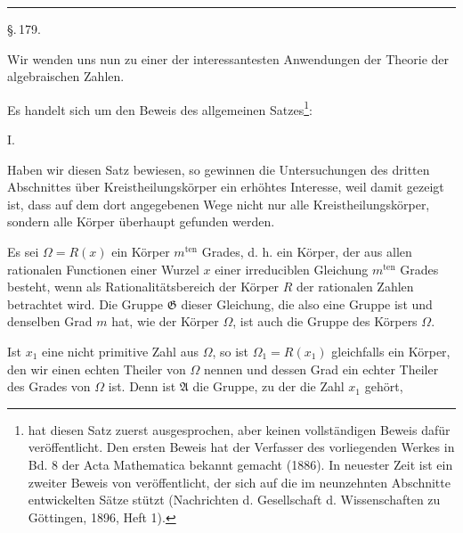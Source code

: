 
\begin{center}


\rule{3cm}{0.4pt}

\S.\,179.

\end{center}

Wir wenden uns nun zu einer der interessantesten Anwendungen der Theorie der algebraischen Zahlen.

\begingroup
\renewcommand{\thefootnote}{\arabic{footnote})}
Es handelt sich um den Beweis des allgemeinen Satzes\footnote{ hat diesen Satz zuerst ausgesprochen, aber keinen vollständigen Beweis dafür veröffentlicht. Den ersten Beweis hat der Verfasser des vorliegenden Werkes in Bd. 8 der Acta Mathematica bekannt gemacht (1886). In neuester Zeit ist ein zweiter Beweis von  veröffentlicht, der sich auf die im neunzehnten Abschnitte entwickelten Sätze stützt (Nachrichten d. Gesellschaft d. Wissenschaften zu Göttingen, 1896, Heft 1).}:
\endgroup

I. 

Haben wir diesen Satz bewiesen, so gewinnen die Untersuchungen des dritten Abschnittes über Kreistheilungskörper ein erhöhtes Interesse, weil damit gezeigt ist, dass auf dem dort angegebenen Wege nicht nur alle Kreistheilungskörper, sondern alle  Körper überhaupt gefunden werden.

Es sei $\Omega = R(x)$ ein  Körper $m^{\text{ten}}$ Grades, d. h. ein Körper, der aus allen rationalen Functionen einer Wurzel $x$ einer irreduciblen  Gleichung $m^{\text{ten}}$ Grades besteht, wenn als Rationalitätsbereich der Körper $R$ der rationalen Zahlen betrachtet wird. Die  Gruppe $\mathfrak{G}$ dieser Gleichung, die also eine  Gruppe ist und denselben Grad $m$ hat, wie der Körper $\Omega$, ist auch die Gruppe des Körpers $\Omega$.

Ist $x_1$ eine nicht primitive Zahl aus $\Omega$, so ist $\Omega_1 = R(x_1)$ gleichfalls ein  Körper, den wir einen echten Theiler von $\Omega$ nennen und dessen Grad ein echter Theiler des Grades von $\Omega$ ist. Denn ist $\mathfrak{A}$ die Gruppe, zu der die Zahl $x_1$ gehört,
